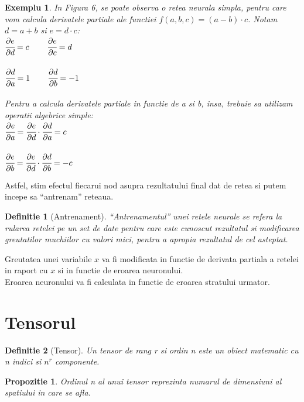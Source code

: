 \documentclass{article}
\newtheorem{definition}{Definitie}[section]
\newtheorem{prop}{Propozitie}[section]
\newtheorem{example}{Exemplu}[section]
\begin{document}
\begin{example}
In Figura 6, se poate observa o retea neurala simpla, pentru care vom calcula derivatele partiale ale functiei $f(a, b, c) = (a - b) \cdot c$. Notam $d = a + b$ si $e = d \cdot c$:\\
$\cfrac{\partial e}{\partial d} = c$\ \ \ \ 
$\cfrac{\partial e}{\partial c} = d$\\ \\
$\cfrac{\partial d}{\partial a} = 1$\ \ \ \ 
$\cfrac{\partial d}{\partial b} = -1$\\ \\
Pentru a calcula derivatele partiale in functie de a si b, insa, trebuie sa utilizam operatii algebrice simple:\\
$\cfrac{\partial e}{\partial a} = \cfrac{\partial e}{\partial d} \cdot \cfrac{\partial d}{\partial a} = c$ \\ \\ 
$\cfrac{\partial e}{\partial b} = \cfrac{\partial e}{\partial d} \cdot \cfrac{\partial d}{\partial b} = -c$ \\
\end{example}

Astfel, stim efectul fiecarui nod asupra rezultatului final dat de retea si putem incepe sa ``antrenam'' reteaua.

\begin{definition}[Antrenament]
``Antrenamentul'' unei retele neurale se refera la rularea	 retelei pe un set de date pentru care este cunoscut rezultatul si modificarea greutatilor muchiilor cu valori mici, pentru a apropia rezultatul de cel asteptat. 
\end{definition}

Greutatea unei variabile $x$ va fi modificata in functie de derivata partiala a retelei in raport cu $x$ si in functie de eroarea neuronului.\\
Eroarea neuronului va fi calculata in functie de eroarea stratului urmator.

\section{Tensorul}

\begin{definition}[Tensor]
Un tensor de rang r si ordin n este un obiect matematic cu n indici si $n^r$ componente. \cite{Tensor}
\end{definition}

\begin{prop}
Ordinul n al unui tensor reprezinta numarul de dimensiuni al spatiului in care se afla. \cite{Tensor}
\end{prop}
\end{document}
